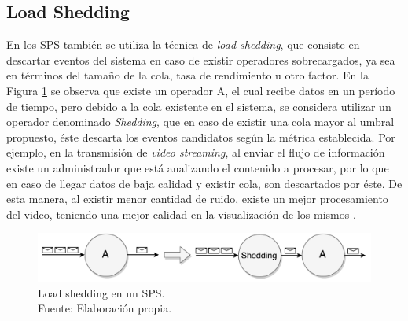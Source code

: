 

\subsection{Load Shedding}
\label{sec:loadSheddingBC}

En los SPS tambi\'en se utiliza la t\'ecnica de \textit{load shedding}, que consiste en descartar eventos del sistema en caso de existir operadores sobrecargados, ya sea \normalsize{en t\'erminos del} tama\~no de la cola, tasa de rendimiento u otro factor. En la Figura \ref{fig:loadShedding} se observa que existe un operador A, el cual recibe datos en un per\'iodo de tiempo, pero debido a la cola existente en el sistema, se considera utilizar un operador denominado \textit{Shedding}, que en caso de existir una cola mayor al umbral propuesto, \'este descarta los eventos candidatos seg\'un la m\'etrica establecida. Por ejemplo, en la transmisi\'on de \textit{video streaming}, al enviar el flujo de informaci\'on existe un administrador que est\'a analizando el contenido a procesar, por lo que en caso de llegar datos de baja calidad y existir cola, son descartados por \'este. De esta manera, al existir menor cantidad de ruido, existe un mejor procesamiento del video, teniendo una mejor calidad en la visualizaci\'on de los mismos \citep{SheuC09}. 

\begin{figure}[!ht]
	\centering
	\includegraphics[scale=0.6]{images/LoadShedding.pdf}
	\caption[Load shedding en un SPS.]{Load shedding en un SPS.\\Fuente: Elaboración propia.}
	\label{fig:loadShedding}
\end{figure}

